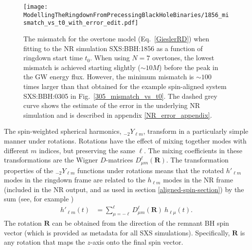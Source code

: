 \begin{figure}[t]
    \centering
    \texttt{[image: ModellingTheRingdownFromPrecessingBlackHoleBinaries/1856\_mismatch\_vs\_t0\_with\_error\_edit.pdf]}
    \caption[Mismatch as a function of ringdown start time for an overtone model fitted to SXS:BBH:1856]{
    The mismatch for the overtone model (Eq.~\ref{GieslerRD}) when fitting to the NR simulation SXS:BBH:1856 as a function of ringdown start time $t_0$. When using $N=7$ overtones, the lowest mismatch is achieved starting slightly ($\sim 10M$) before the peak in the GW energy flux.
    However, the minimum mismatch is $\sim 100$ times larger than that obtained for the example spin-aligned system SXS:BBH:0305 in Fig.~\ref{305_mismatch_vs_t0}. The dashed grey curve shows the estimate of the error in the underlying NR simulation and is described in appendix \ref{NR_error_appendix}.
    }
    \label{1856_mismatch_vs_t0}
\end{figure}

The spin-weighted spherical harmonics, ${}_{-2}Y_{\ell m}$, transform in a particularly simple manner under rotations.
Rotations have the effect of mixing together modes with different $m$ indices, but preserving the same $\ell$. 
The mixing coefficients in these transformations are the Wigner $D$-matrices $D^{\ell}_{\mu m} (\mathbf{R})$.
The transformation properties of the ${}_{-2}Y_{\ell m}$ functions under rotations means that the rotated $h'_{\ell m}$ modes in the ringdown frame are related to the $h_{\ell m}$ modes in the NR frame (included in the NR output, and as used in section \ref{aligned-spin-section}) by the sum (see, for example \cite{Boyle:2013nka, Schmidt:2010it, OShaughnessy:2011pmr})
\begin{align}\label{Yrotation_wignerD}
    h'_{\ell m}(t) &= \sum_{\mu = -\ell}^{\ell} D^{\ell}_{\mu m} (\mathbf{R}) ~ h_{\ell \mu}(t).
\end{align}
The rotation $\mathbf{R}$ can be obtained from the direction of the remnant BH spin vector (which is provided as metadata for all SXS simulations). Specifically, $\mathbf{R}$ is any rotation that maps the $z$-axis onto the final spin vector.

